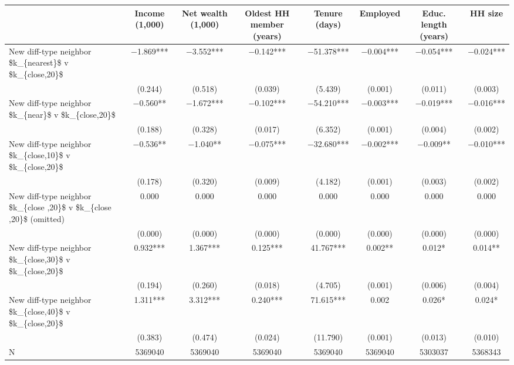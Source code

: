 \begin{tabular}[t]{lccccccc}
\toprule
  & Income (1,000) & Net wealth (1,000) & Oldest HH member (years) & Tenure (days) & Employed & Educ. length (years) & HH size\\
\midrule
New diff-type neighbor \$k\_\{nearest\}\$ v \$k\_\{close,20\}\$ & \num{-1.869}*** & \num{-3.552}*** & \num{-0.142}*** & \num{-51.378}*** & \num{-0.004}*** & \num{-0.054}*** & \num{-0.024}***\\
 & (\num{0.244}) & (\num{0.518}) & (\num{0.039}) & (\num{5.439}) & (\num{0.001}) & (\num{0.011}) & (\num{0.003})\\
New diff-type neighbor \$k\_\{near\}\$ v \$k\_\{close,20\}\$ & \num{-0.560}** & \num{-1.672}*** & \num{-0.102}*** & \num{-54.210}*** & \num{-0.003}*** & \num{-0.019}*** & \num{-0.016}***\\
 & (\num{0.188}) & (\num{0.328}) & (\num{0.017}) & (\num{6.352}) & (\num{0.001}) & (\num{0.004}) & (\num{0.002})\\
New diff-type neighbor \$k\_\{close,10\}\$ v \$k\_\{close,20\}\$ & \num{-0.536}** & \num{-1.040}** & \num{-0.075}*** & \num{-32.680}*** & \num{-0.002}*** & \num{-0.009}** & \num{-0.010}***\\
 & (\num{0.178}) & (\num{0.320}) & (\num{0.009}) & (\num{4.182}) & (\num{0.001}) & (\num{0.003}) & (\num{0.002})\\
New diff-type neighbor \$k\_\{close ,20\}\$ v \$k\_\{close ,20\}\$ (omitted) & \num{0.000} & \num{0.000} & \num{0.000} & \num{0.000} & \num{0.000} & \num{0.000} & \num{0.000}\\
 & (\num{0.000}) & (\num{0.000}) & (\num{0.000}) & (\num{0.000}) & (\num{0.000}) & (\num{0.000}) & (\num{0.000})\\
New diff-type neighbor \$k\_\{close,30\}\$ v \$k\_\{close,20\}\$ & \num{0.932}*** & \num{1.367}*** & \num{0.125}*** & \num{41.767}*** & \num{0.002}** & \num{0.012}* & \num{0.014}**\\
 & (\num{0.194}) & (\num{0.260}) & (\num{0.018}) & (\num{4.705}) & (\num{0.001}) & (\num{0.006}) & (\num{0.004})\\
New diff-type neighbor \$k\_\{close,40\}\$ v \$k\_\{close,20\}\$ & \num{1.311}*** & \num{3.312}*** & \num{0.240}*** & \num{71.615}*** & \num{0.002} & \num{0.026}* & \num{0.024}*\\
 & (\num{0.383}) & (\num{0.474}) & (\num{0.024}) & (\num{11.790}) & (\num{0.001}) & (\num{0.013}) & (\num{0.010})\\
\midrule
N & 5369040 & 5369040 & 5369040 & 5369040 & 5369040 & 5303037 & 5368343\\

\end{tabular}
